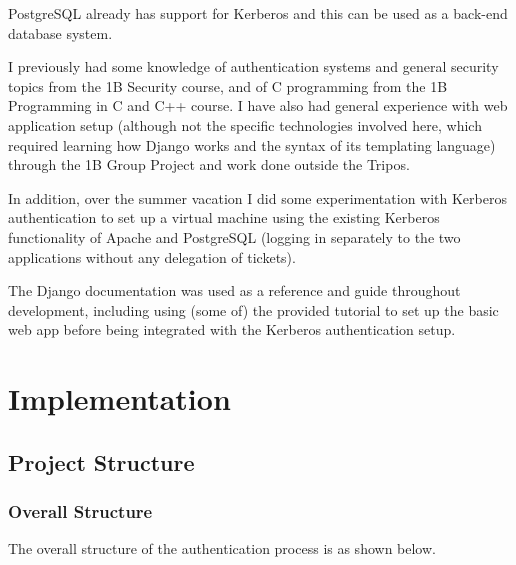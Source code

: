 \documentclass[12pt]{report}
\begin{document}
PostgreSQL already has support for Kerberos and this can be used as a back-end database system.

I previously had some knowledge of authentication systems and general security topics from the 1B Security course, and of C programming from the 1B Programming in C and C++ course. I have also had general experience with web application setup (although not the specific technologies involved here, which required learning how Django works and the syntax of its templating language) through the 1B Group Project and work done outside the Tripos.

In addition, over the summer vacation I did some experimentation with Kerberos authentication to set up a virtual machine using the existing Kerberos functionality of Apache and PostgreSQL (logging in separately to the two applications without any delegation of tickets).

The Django documentation\cite{Django-docs} was used as a reference and guide throughout development, including using (some of) the provided tutorial to set up the basic web app before being integrated with the Kerberos authentication setup.


\chapter{Implementation}

\section{Project Structure}

\subsection{Overall Structure}
The overall structure of the authentication process is as shown below.
\end{document}
